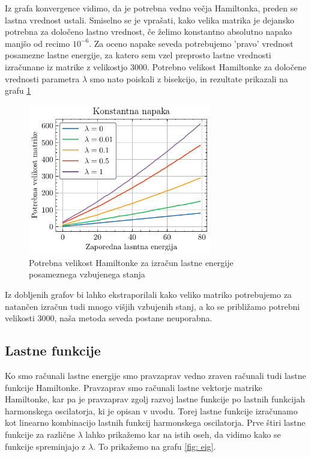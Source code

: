 \documentclass[slovene,11pt,a4paper]{article}
\begin{document}
Iz grafa konvergence vidimo, da je potrebna vedno večja Hamiltonka, preden se lastna vrednost ustali. Smiselno se je vprašati, kako velika matrika je dejansko potrebna za določeno lastno vrednost, če želimo konstantno absolutno napako manjšo od recimo $10^{-6}$. Za oceno napake seveda potrebujemo 'pravo' vrednost posamezne lastne energije, za katero sem vzel preprosto lastne vrednosti izračunane iz matrike z velikostjo 3000. Potrebno velikost Hamiltonke za določene vrednosti parametra $\lambda$ smo nato poiskali z bisekcijo, in rezultate prikazali na grafu \ref{fig: dino}

\begin{figure}[ht]
\begin{center}
  \includegraphics[width=8cm]{graphs/nodi.pdf}
  \caption{Potrebna velikost Hamiltonke za izračun lastne energije posameznega vzbujenega stanja}
  \label{fig: dino}
\end{center}
\end{figure}

Iz dobljenih grafov bi lahko ekstraporilali kako veliko matriko potrebujemo za natančen izračun tudi mnogo višjih vzbujenih stanj, a ko se približamo potrebni velikosti 3000, naša metoda seveda postane neuporabna.


\bigskip
\bigskip

\subsection{Lastne funkcije}

Ko smo računali lastne energije smo pravzaprav vedno zraven računali tudi lastne funkcije Hamiltonke. Pravzaprav smo računali lastne vektorje matrike Hamiltonke, kar pa je pravzaprav zgolj razvoj lastne funkcije po lastnih funkcijah harmonskega oscilatorja, ki je opisan v uvodu. Torej lastne funkcije izračunamo kot linearno kombinacijo lastnih funkcij harmonskega oscilatorja. Prve štiri lastne funkcije za različne $\lambda$ lahko prikažemo kar na istih oseh, da vidimo kako se funkcije spreminjajo z $\lambda$. To prikažemo na grafu \ref{fig: eig}.
\end{document}
